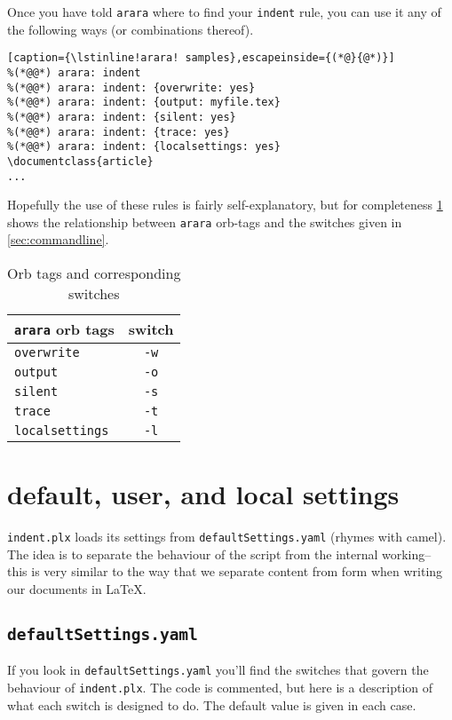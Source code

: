 \documentclass[11pt]{article}
\begin{document}
Once you have told \lstinline!arara! where to find your \lstinline!indent! rule, 
you can use it any of the following ways (or combinations thereof). 

\begin{lstlisting}[caption={\lstinline!arara! samples},escapeinside={(*@}{@*)}]
%(*@@*) arara: indent
%(*@@*) arara: indent: {overwrite: yes}
%(*@@*) arara: indent: {output: myfile.tex}
%(*@@*) arara: indent: {silent: yes}
%(*@@*) arara: indent: {trace: yes}
%(*@@*) arara: indent: {localsettings: yes}
\documentclass{article}
...
\end{lstlisting}

Hopefully the use of these rules is fairly self-explanatory, but for completeness
\cref{tab:orbsandswitches} shows the relationship between \lstinline!arara! orb-tags and the 
switches given in \cref{sec:commandline}.

\begin{table}[!ht]
	\centering
	\caption{Orb tags and corresponding switches}
	\label{tab:orbsandswitches}
	\begin{tabular}{lc}
		\toprule
		\lstinline!arara! orb tags & switch         \\
		\midrule
		\lstinline!overwrite!      & \lstinline!-w! \\
		\lstinline!output!         & \lstinline!-o! \\
		\lstinline!silent!         & \lstinline!-s! \\
		\lstinline!trace!          & \lstinline!-t! \\
		\lstinline!localsettings!  & \lstinline!-l! \\
		\bottomrule
	\end{tabular}
\end{table}
\section{default, user, and local settings}\label{sec:defuseloc}
\lstinline!indent.plx! loads its settings from \lstinline!defaultSettings.yaml! 
(rhymes with camel). The idea is to separate the behaviour of the script 
from the internal working-- this is very similar to the way that we separate content
from form when writing our documents in \LaTeX.


\subsection{\lstinline!defaultSettings.yaml!}
If you look in \lstinline!defaultSettings.yaml! you'll find the switches 
that govern the behaviour of \lstinline!indent.plx!. The code is commented, 
but here is a description of what each switch is designed to do. The default 
value is given in each case.
\end{document}
